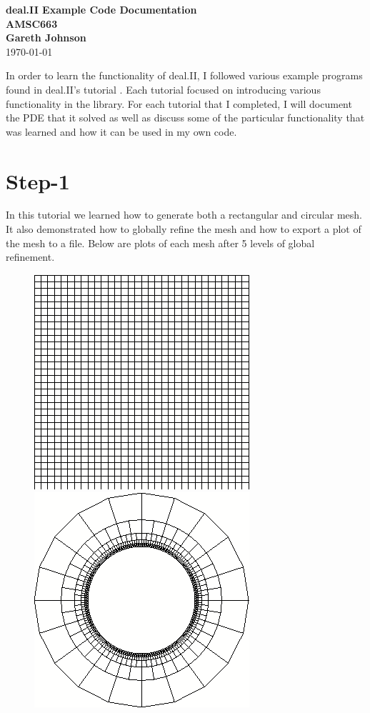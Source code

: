 \documentclass[11pt,fullpage]{article}
\theoremstyle{lemma}
\theoremstyle{definition}
\theoremstyle{lemma}
\begin{document}
	
	\begin{center}
		\textbf{\Large{deal.II Example Code Documentation}}
		\\
		\textbf{\Large{AMSC663}} \\ 
		\textbf{\large{Gareth Johnson}}
		\\
		\today
	\end{center}

In order to learn the functionality of deal.II, I followed various example programs found in deal.II's tutorial \cite{DealIITut}. Each tutorial focused on introducing various functionality in the library. For each tutorial that I completed, I will document the PDE that it solved as well as discuss some of the particular functionality that was learned and how it can be used in my own code.

\section*{Step-1}
In this tutorial we learned how to generate both a rectangular and circular mesh. It also demonstrated how to globally refine the mesh and how to export a plot of the mesh to a file. Below are plots of each mesh after 5 levels of global refinement.

\begin{figure}[!ht]
	\begin{minipage}{.4\paperwidth}
		\centering
		\includegraphics[scale=.45]{Step1-1.png}
	\end{minipage}%
	\begin{minipage}{.4\paperwidth}
		\centering
		\includegraphics[scale=.45]{Step1-2.png}
	\end{minipage}
\end{figure}
\end{document}
